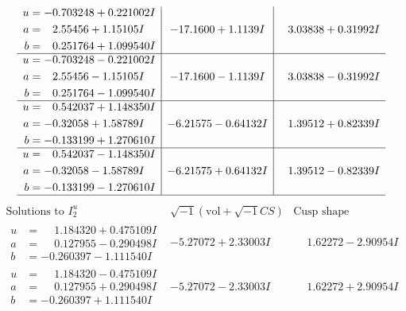 \documentclass[1p]{elsarticle_modified}
\theoremstyle{definition}
\newcommand{\I}{\sqrt{-1}}
\begin{document}
$$\begin{array}{c|c|c}
\begin{aligned}
u &= -0.703248 + 0.221002 I \\
a &= \phantom{-}2.55456 + 1.15105 I \\
b &= \phantom{-}0.251764 + 1.099540 I\end{aligned}
 & -17.1600 + 1.1139 I & \phantom{-}3.03838 + 0.31992 I \\ \hline\begin{aligned}
u &= -0.703248 - 0.221002 I \\
a &= \phantom{-}2.55456 - 1.15105 I \\
b &= \phantom{-}0.251764 - 1.099540 I\end{aligned}
 & -17.1600 - 1.1139 I & \phantom{-}3.03838 - 0.31992 I \\ \hline\begin{aligned}
u &= \phantom{-}0.542037 + 1.148350 I \\
a &= -0.32058 + 1.58789 I \\
b &= -0.133199 + 1.270610 I\end{aligned}
 & -6.21575 - 0.64132 I & \phantom{-}1.39512 + 0.82339 I \\ \hline\begin{aligned}
u &= \phantom{-}0.542037 - 1.148350 I \\
a &= -0.32058 - 1.58789 I \\
b &= -0.133199 - 1.270610 I\end{aligned}
 & -6.21575 + 0.64132 I & \phantom{-}1.39512 - 0.82339 I\\
 \hline 
 \end{array}$$\newpage$$\begin{array}{c|c|c}  
\text{Solutions to }I^u_{2}& \I (\text{vol} + \sqrt{-1}CS) & \text{Cusp shape}\\
 \hline 
\begin{aligned}
u &= \phantom{-}1.184320 + 0.475109 I \\
a &= \phantom{-}0.127955 - 0.290498 I \\
b &= -0.260397 - 1.111540 I\end{aligned}
 & -5.27072 + 2.33003 I & \phantom{-}1.62272 - 2.90954 I \\ \hline\begin{aligned}
u &= \phantom{-}1.184320 - 0.475109 I \\
a &= \phantom{-}0.127955 + 0.290498 I \\
b &= -0.260397 + 1.111540 I\end{aligned}
 & -5.27072 - 2.33003 I & \phantom{-}1.62272 + 2.90954 I \\ \hline\begin{aligned}

\end{aligned}
\end{array}$$
\end{document}
